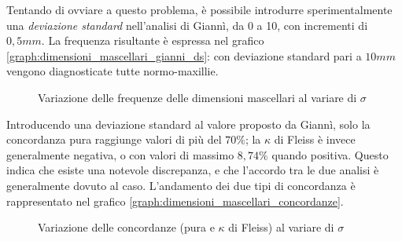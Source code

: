 Tentando di ovviare a questo problema, è possibile introdurre sperimentalmente una \emph{deviazione standard} nell'analisi di Giannì, da 0 a 10, con incrementi di $0,5 mm$. La frequenza risultante è espressa nel grafico \vref{graph:dimensioni_mascellari_gianni_ds}: con deviazione standard pari a $10 mm$ vengono diagnosticate tutte normo-maxillie.

\begin{figure}[ht!]
\centering

\caption{Variazione delle frequenze delle dimensioni mascellari al variare di $\sigma$}
\label{graph:dimensioni_mascellari_gianni_ds}
\end{figure}

Introducendo una deviazione standard al valore proposto da Giannì, solo la concordanza pura raggiunge valori di più del $70\%$; la $\kappa$ di Fleiss è invece generalmente negativa, o con valori di massimo $8,74\%$ quando positiva. Questo indica che esiste una notevole discrepanza, e che l'accordo tra le due analisi è generalmente dovuto al caso. L'andamento dei due tipi di concordanza è rappresentato nel grafico \vref{graph:dimensioni_mascellari_concordanze}.

\begin{figure}[ht!]
\centering

\caption{Variazione delle concordanze (pura e $\kappa$ di Fleiss) al variare di $\sigma$}
\label{graph:dimensioni_mascellari_concordanze}
\end{figure}
